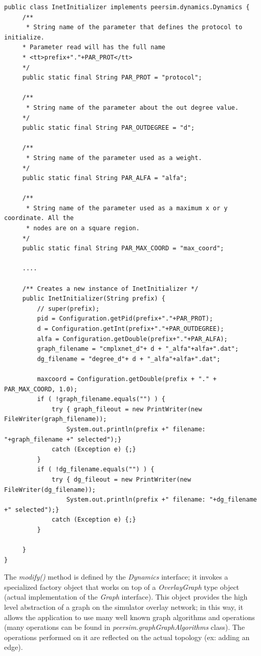 \documentclass[a4paper,12pt]{article}
\begin{document}
\footnotesize
\begin{verbatim}
public class InetInitializer implements peersim.dynamics.Dynamics {
     /** 
      * String name of the parameter that defines the protocol to initialize.
     * Parameter read will has the full name
     * <tt>prefix+"."+PAR_PROT</tt>
     */
     public static final String PAR_PROT = "protocol";
 
     /**
      * String name of the parameter about the out degree value.
     */
     public static final String PAR_OUTDEGREE = "d";
     
     /**
      * String name of the parameter used as a weight.
     */
     public static final String PAR_ALFA = "alfa";
     
     /**
      * String name of the parameter used as a maximum x or y coordinate. All the 
      * nodes are on a square region.
     */
     public static final String PAR_MAX_COORD = "max_coord";
    
     ....
     
     /** Creates a new instance of InetInitializer */
     public InetInitializer(String prefix) {
         // super(prefix);
         pid = Configuration.getPid(prefix+"."+PAR_PROT);
         d = Configuration.getInt(prefix+"."+PAR_OUTDEGREE);
         alfa = Configuration.getDouble(prefix+"."+PAR_ALFA);
         graph_filename = "cmplxnet_d"+ d + "_alfa"+alfa+".dat";
         dg_filename = "degree_d"+ d + "_alfa"+alfa+".dat";
         
         maxcoord = Configuration.getDouble(prefix + "." + PAR_MAX_COORD, 1.0);
         if ( !graph_filename.equals("") ) {
             try { graph_fileout = new PrintWriter(new FileWriter(graph_filename)); 
                 System.out.println(prefix +" filename: "+graph_filename +" selected");}
             catch (Exception e) {;}
         }
         if ( !dg_filename.equals("") ) {
             try { dg_fileout = new PrintWriter(new FileWriter(dg_filename)); 
                 System.out.println(prefix +" filename: "+dg_filename +" selected");}
             catch (Exception e) {;}
         }
         
     }
}
\end{verbatim}
\normalsize
     
 The \emph{modify()} method is defined by the \emph{Dynamics} interface;
 it invokes a specialized factory object  that works on top of a 
\emph{OverlayGraph} type object (actual implementation of the \emph{Graph} 
interface).  This object provides the high level abstraction of a graph on 
the simulator overlay network; in this way, it allows the application to 
use many well known graph algorithms and operations (many operations can 
be found in \emph{peersim.graphGraphAlgorithms} class). The operations 
performed on it are reflected on the actual topology (ex: adding an edge).
\end{document}
